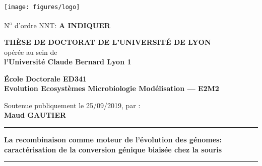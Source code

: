 

\begingroup




\setlength{\parindent}{0pt}
\thispagestyle{empty}


\begin{center}
\texttt{[image: figures/logo]} %
\end{center}


\fontsize{11pt}{13pt}\selectfont
N\textsuperscript{o} d'ordre NNT: \textbf{A INDIQUER}%

\vspace{1cm}

\begin{center}
\fontsize{14pt}{16pt}\selectfont
\textbf{\uppercase{Thèse de doctorat de l'université de Lyon}}\\
\fontsize{12pt}{14pt}\selectfont
opérée au sein de\\
\textbf{l'Université Claude Bernard Lyon 1}

\vspace{0.5cm}

\textbf{École Doctorale ED341\\%
Evolution Ecosyst\`emes Microbiologie Modélisation — E2M2}%

\vspace{0.5cm}



\vspace{1.5cm}

Soutenue publiquement le 25/09/2019, par :\\
\fontsize{14pt}{16pt}\selectfont
\textbf{Maud GAUTIER}

\vspace{1.5cm} %

\rule[20pt]{\textwidth}{0.5pt}

\fontsize{25pt}{28pt}\selectfont
\textbf{La recombinaison comme moteur de l'\'evolution des g\'enomes: caract\'erisation de la conversion g\'enique biais\'ee chez la souris}

\rule{\textwidth}{0.5pt}

\vspace{2cm} %
\end{center}

